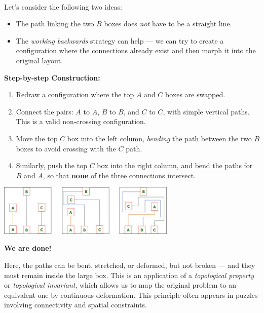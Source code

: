 \documentclass{article}
\begin{document}
\begin{soln}\ \\\indent
    Let’s consider the following two ideas:
    \begin{itemize}[topsep=0pt, itemsep=2pt]
        \item The path linking the two \( B \) boxes does \emph{not} have to be a straight line.
        \item The \textit{working backwards} strategy can help — we can try to create a configuration where the connections already exist and then morph it into the original layout.
    \end{itemize}
    
    \textbf{Step-by-step Construction:}
    \begin{enumerate}[label=(\arabic*), itemsep=2pt]
        \item Redraw a configuration where the top \( A \) and \( C \) boxes are swapped.
        \item Connect the pairs: \( A \) to \( A \), \( B \) to \( B \), and \( C \) to \( C \), with simple vertical paths. This is a valid non-crossing configuration.
        \item Move the top \( C \) box into the left column, \textit{bending} the path between the two \( B \) boxes to avoid crossing with the \( C \) path.
        \item Similarly, push the top \( C \) box into the right column, and bend the paths for \( B \) and \( A \), so that \textbf{none} of the three connections intersect.
    \end{enumerate}

    \begin{center}
        \includegraphics[width=8.5cm]{./png/3-houses-2.png}
    \end{center}

    \textbf{We are done!}
\end{soln}

\begin{remark*}
    Here, the paths can be bent, stretched, or deformed, but not broken — and they must remain inside the large box. This is an application of a \emph{topological property} or \emph{topological invariant}, which allows us to map the original problem to an equivalent one by continuous deformation. This principle often appears in puzzles involving connectivity and spatial constraints.
\end{remark*}
\end{document}
